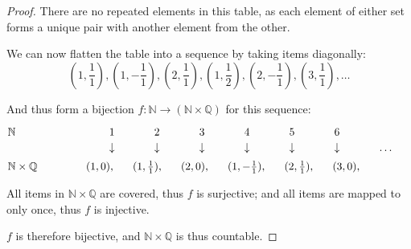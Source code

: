 \documentclass[12pt, a4paper]{article}
\newcommand{\Q}{\mathbb{Q}}
\newcommand{\N}{\mathbb{N}}
\begin{document}
\begin{proof}
    There are no repeated elements in this table, as each element of either
    set forms a unique pair with another element from the other.

    We can now flatten the table into a sequence by taking items diagonally:
    \[
        (1, \frac{1}{1}), (1, -\frac{1}{1}),
        (2, \frac{1}{1}), (1, \frac{1}{2}),
        (2, -\frac{1}{1}), (3, \frac{1}{1}), \ldots
    \]

    And thus form a bijection $f \colon \N \to (\N \times \Q)$ for this sequence:

    \[
        \makebox[2cm][l]{$\N$}\makebox[10cm][s]{
            1 2 3 4 5 6
        }\makebox[1cm]{}
    \]
    \[
        \makebox[2cm][l]{}\makebox[10cm][s]{
            \mbox{$\downarrow$}
            \mbox{$\downarrow$}
            \mbox{$\downarrow$}
            \mbox{$\downarrow$}
            \mbox{$\downarrow$}
            \mbox{$\downarrow$}
        }\makebox[1cm][l]{$\ldots$}
    \]
    \[
        \makebox[2cm][l]{$\N \times \Q$}\makebox[10cm][s]{
            $(1, 0)$, $(1, \frac{1}{1})$,
            $(2, 0)$, $(1, -\frac{1}{1})$,
            $(2, \frac{1}{1})$, $(3, 0)$,
        }\makebox[1cm]{}
    \]

    All items in $\N \times \Q$ are covered, thus $f$ is surjective; and all items
    are mapped to only once, thus $f$ is injective.

    $f$ is therefore bijective, and $\N \times \Q$ is thus countable.

\end{proof}
\end{document}
